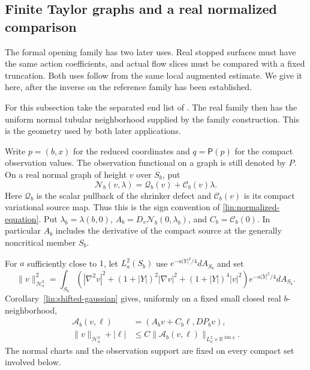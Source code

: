 \subsection{Finite Taylor graphs and a real normalized comparison}

The formal opening family has two later uses.  Real stopped surfaces
must have the same action coefficients, and actual flow slices must be
compared with a fixed truncation.  Both uses follow from the same local
augmented estimate.  We give it here, after the inverse on the reference
family has been established.

For this subsection take the separated end list of
.  The real family then has the uniform normal tubular
neighborhood supplied by the family construction.  This is the geometry
used by both later applications.

Write $p=(b,x)$ for the reduced coordinates and
$q=\mathsf P(p)$ for the compact observation values.  The observation
functional on a graph is still denoted by $P$.  On a real normal graph
of height $v$ over $S_b$, put
\[
 \mathcal N_b(v,\lambda)
   =\mathcal Q_b(v)+\mathcal C_b(v)\lambda.
\]
Here $\mathcal Q_b$ is the scalar pullback of the shrinker defect and
$\mathcal C_b(v)$ is its compact variational source map.  Thus this is
the sign convention of \eqref{lin:normalized-equation}.  Put
$\lambda_b=\lambda(b,0)$,
$A_b=D_v\mathcal N_b(0,\lambda_b)$, and
$C_b=\mathcal C_b(0)$.  In particular $A_b$ includes the derivative of
the compact source at the generally noncritical member $S_b$.

For $a$ sufficiently close to $1$, let $L^2_a(S_b)$ use
$e^{-a|Y|^2/4}dA_{S_b}$ and set
\begin{equation}\label{ref:weighted-H2}
 \|v\|_{\mathcal H^2_a}^2
 =\int_{S_b}\left(|\nabla^2v|^2+(1+|Y|)^2|\nabla v|^2
                    +(1+|Y|)^4|v|^2\right)e^{-a|Y|^2/4}dA_{S_b}.
\end{equation}
Corollary~\ref{lin:shifted-gaussian} gives, uniformly on a fixed small
closed real $b$-neighborhood,
\begin{equation}\label{ref:augmented-comparison}
 \begin{split}
 \mathcal A_b(v,\ell)&=(A_bv+C_b\ell,DP_bv),\\
 \|v\|_{\mathcal H^2_a}+|\ell|
   &\le C\|\mathcal A_b(v,\ell)\|_{L^2_a\times\mathbb R^{\dim q}}.
 \end{split}
\end{equation}
The normal charts and the observation support are fixed on every
compact set involved below.

